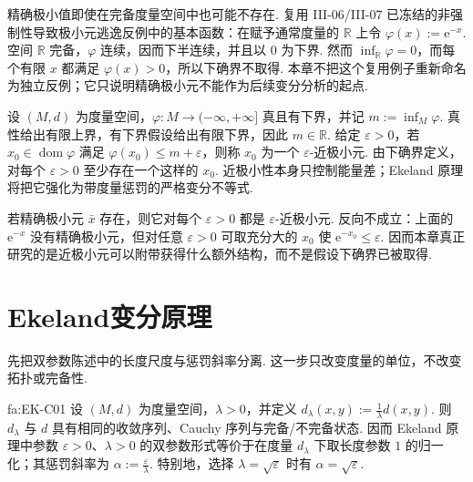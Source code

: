 精确极小值即使在完备度量空间中也可能不存在. 复用 III-06/III-07 已冻结的非强制性导致极小元逃逸反例中的基本函数：在赋予通常度量的 \(\displaystyle\mathbb R\) 上令
\(\displaystyle \varphi(x):=\mathrm{e}^{-x}\).
空间 \(\displaystyle\mathbb R\) 完备，\(\displaystyle\varphi\) 连续，因而下半连续，并且以 \(\displaystyle0\) 为下界. 然而 \(\displaystyle\inf_{\mathbb R}\varphi=0\)，而每个有限 \(\displaystyle x\) 都满足 \(\displaystyle\varphi(x)>0\)，所以下确界不取得. 本章不把这个复用例子重新命名为独立反例；它只说明精确极小元不能作为后续变分分析的起点.

设 \(\displaystyle(M,d)\) 为度量空间，\(\displaystyle\varphi:M\to(-\infty,+\infty]\) 真且有下界，并记
\(\displaystyle m:=\inf_M\varphi\).
真性给出有限上界，有下界假设给出有限下界，因此 \(\displaystyle m\in\mathbb R\). 给定 \(\displaystyle\varepsilon>0\)，若 \(\displaystyle x_0\in\operatorname{dom}\varphi\) 满足 \(\displaystyle\varphi(x_0)\leqslant m+\varepsilon\)，则称 \(\displaystyle x_0\) 为一个 \(\displaystyle\varepsilon\)-近极小元. 由下确界定义，对每个 \(\displaystyle\varepsilon>0\) 至少存在一个这样的 \(\displaystyle x_0\). 近极小性本身只控制能量差；Ekeland 原理将把它强化为带度量惩罚的严格变分不等式.

\begin{FARemark}[近极小元与精确极小元]
若精确极小元 \(\displaystyle\bar x\) 存在，则它对每个 \(\displaystyle\varepsilon>0\) 都是 \(\displaystyle\varepsilon\)-近极小元. 反向不成立：上面的 \(\displaystyle\mathrm{e}^{-x}\) 没有精确极小元，但对任意 \(\displaystyle\varepsilon>0\) 可取充分大的 \(\displaystyle x_0\) 使 \(\displaystyle\mathrm{e}^{-x_0}\leqslant\varepsilon\). 因而本章真正研究的是近极小元可以附带获得什么额外结构，而不是假设下确界已被取得.
\end{FARemark}

\section{Ekeland变分原理}\label{sec:iii08-ekeland}

先把双参数陈述中的长度尺度与惩罚斜率分离. 这一步只改变度量的单位，不改变拓扑或完备性.

\begin{FAProposition}[C][参数归一化与度量重标]{fa:EK-C01}
设 \(\displaystyle(M,d)\) 为度量空间，\(\displaystyle\lambda>0\)，并定义
\(\displaystyle d_\lambda(x,y):=\frac{1}{\lambda}d(x,y)\).
则 \(\displaystyle d_\lambda\) 与 \(\displaystyle d\) 具有相同的收敛序列、Cauchy 序列与完备/不完备状态. 因而 Ekeland 原理中参数 \(\displaystyle\varepsilon>0\)、\(\displaystyle\lambda>0\) 的双参数形式等价于在度量 \(\displaystyle d_\lambda\) 下取长度参数 \(\displaystyle1\) 的归一化；其惩罚斜率为
\(\displaystyle \alpha:=\frac{\varepsilon}{\lambda}\).
特别地，选择 \(\displaystyle\lambda=\sqrt{\varepsilon}\) 时有 \(\displaystyle\alpha=\sqrt{\varepsilon}\).
\end{FAProposition}

